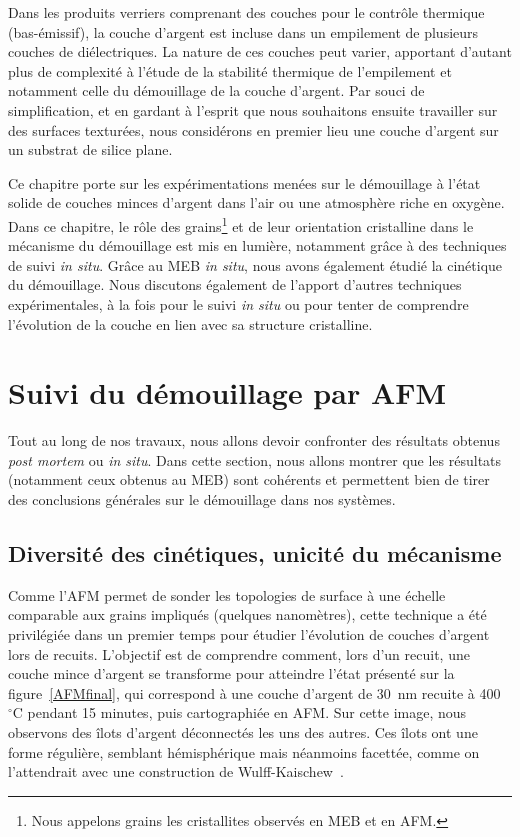 \newpage\null\thispagestyle{empty}\newpage
\minitoc
\newpage

Dans les produits verriers comprenant des couches pour le contrôle thermique (bas-émissif), la couche d'argent est incluse dans un empilement de plusieurs couches de diélectriques. La nature de ces couches peut varier, apportant d'autant plus de complexité à l'étude de la stabilité thermique de l'empilement et notamment celle du démouillage de la couche d'argent. Par souci de simplification, et en gardant à l'esprit que nous souhaitons ensuite travailler sur des surfaces texturées, nous considérons en premier lieu une couche d'argent sur un substrat de silice plane.\par
Ce chapitre porte sur les expérimentations menées sur le démouillage à l'état solide de couches minces d'argent dans l'air ou une atmosphère riche en oxygène. Dans ce chapitre, le rôle des grains\footnote{Nous appelons \og grains \fg{} les cristallites observés en MEB et en AFM.} et de leur orientation cristalline dans le mécanisme du démouillage est mis en lumière, notamment grâce à des techniques de suivi \textit{in situ}. Grâce au MEB \textit{in situ}, nous avons également étudié la cinétique du démouillage. Nous discutons également de l'apport d'autres techniques expérimentales, à la fois pour le suivi \textit{in situ} ou pour tenter de comprendre l'évolution de la couche en lien avec sa structure cristalline.\par 


\section{Suivi du démouillage par AFM}
Tout au long de nos travaux, nous allons devoir confronter des résultats obtenus \textit{post mortem} ou \textit{in situ}. Dans cette section, nous allons montrer que les résultats (notamment ceux obtenus au MEB) sont cohérents et permettent bien de tirer des conclusions générales sur le démouillage dans nos systèmes. 

\subsection{Diversité des cinétiques, unicité du mécanisme}
\label{sPostMortem}
Comme l'AFM permet de sonder les topologies de surface à une échelle comparable aux grains impliqués (quelques nanomètres), cette technique a été privilégiée dans un premier temps pour étudier l'évolution de couches d'argent lors de recuits. L'objectif est de comprendre comment, lors d'un recuit, une couche mince d'argent se transforme pour atteindre l'état présenté sur la figure~\ref{AFMfinal}, qui correspond à une couche d'argent de 30~nm recuite à 400~$^\circ$C pendant 15 minutes, puis cartographiée en AFM. Sur cette image, nous observons des îlots d'argent déconnectés les uns des autres. Ces îlots ont une forme régulière, semblant hémisphérique mais néanmoins facettée, comme on l'attendrait avec une construction de Wulff-Kaischew~\cite{wulff1901xxv, kaischew1951thermodynamique, winterbottom1967equilibrium}.\par 

